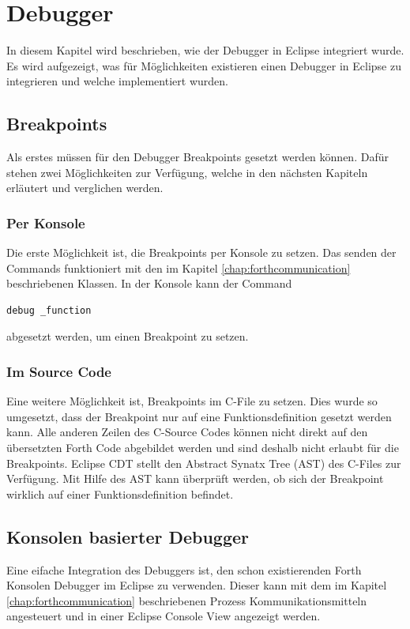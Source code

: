 \chapter{Debugger}
\label{chap:debugger}
In diesem Kapitel wird beschrieben, wie der Debugger in Eclipse integriert wurde. Es wird aufgezeigt, was für Möglichkeiten existieren einen Debugger in Eclipse zu integrieren und welche implementiert wurden.

\section{Breakpoints}
Als erstes müssen für den Debugger Breakpoints gesetzt werden können. Dafür stehen zwei Möglichkeiten zur Verfügung, welche in den nächsten Kapiteln erläutert und verglichen werden.

\subsection{Per Konsole}

Die erste Möglichkeit ist, die Breakpoints per Konsole zu setzen. Das senden der Commands funktioniert mit den im Kapitel \ref{chap:forthcommunication} beschriebenen Klassen. In der Konsole kann der Command

%
\begin{verbatim}
debug _function
\end{verbatim}
%
abgesetzt werden, um einen Breakpoint zu setzen.

\subsection{Im Source Code}

Eine weitere Möglichkeit ist, Breakpoints im C-File zu setzen. Dies wurde so umgesetzt, dass der Breakpoint nur auf eine Funktionsdefinition gesetzt werden kann. Alle anderen Zeilen des C-Source Codes können nicht direkt auf den übersetzten Forth Code abgebildet werden und sind deshalb nicht erlaubt für die Breakpoints.
\newline
Eclipse CDT stellt den Abstract Synatx Tree (AST) des C-Files zur Verfügung. Mit Hilfe des AST kann überprüft werden, ob sich der Breakpoint wirklich auf einer Funktionsdefinition befindet.
\newpage
\section{Konsolen basierter Debugger}

Eine eifache Integration des Debuggers ist, den schon existierenden Forth Konsolen Debugger im Eclipse zu verwenden. Dieser kann mit dem im Kapitel \ref{chap:forthcommunication} beschriebenen Prozess Kommunikationsmitteln angesteuert und in einer Eclipse Console View angezeigt werden.

